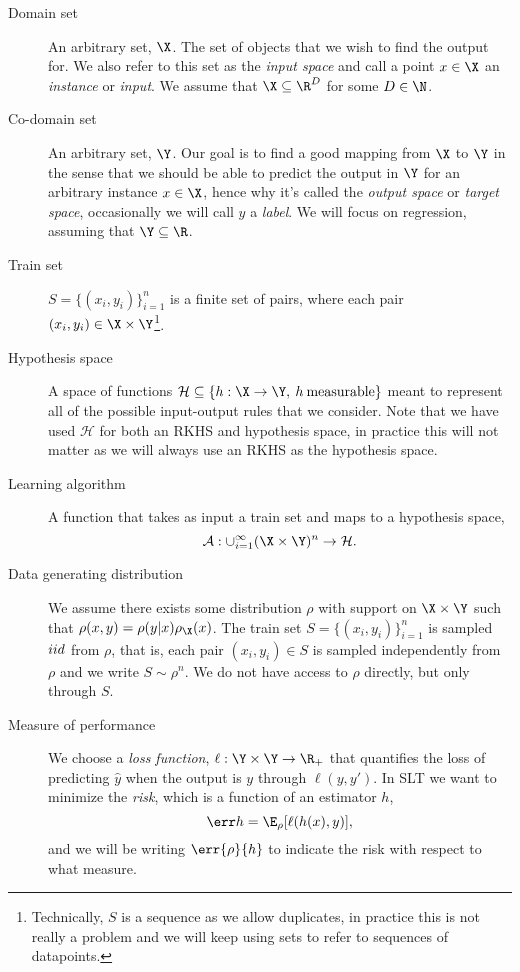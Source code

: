 \begin{description}
\item[{Domain set}] An arbitrary set, \(\X\). The set of objects that we wish to
find the output for. We also refer to this set as the \emph{input space} and
call a point \(x \in \X\) an \emph{instance} or \emph{input}. We assume that
\(\X \subseteq \R^{D}\) for some \(D \in \N\).
\item[{Co-domain set}] An arbitrary set, \(\Y\). Our goal is to find a good
mapping from \(\X\) to \(\Y\) in the sense that we should be able to predict the
output in \(\Y\) for an arbitrary instance \(x \in \X\), hence why it's called
the \emph{output space} or \emph{target space}, occasionally we will call \(y\)
a \emph{label}. We will focus on regression, assuming that \(\Y \subseteq \R\).
\item[{Train set}] \(S = \{(x_{i}, y_{i})\}_{i=1}^{n}\) is a finite set of
pairs, where each pair \((x_{i}, y_{i}) \in \X \times \Y\)\footnote{Technically,
\(S\) is a sequence as we allow duplicates, in practice this is not really a
problem and we will keep using sets to refer to sequences of datapoints.}.
\item[{Hypothesis space}] A space of functions \(\mathcal{H} \subseteq \{h : \X
\to \Y, \: h \: \mathrm{measurable}\}\) meant to represent all of the possible
input-output rules that we consider. Note that we have used \(\mathcal{H}\) for
both an RKHS and hypothesis space, in practice this will not matter as we will
always use an RKHS as the hypothesis space.
\item[{Learning algorithm}] A function that takes as input a train set and maps
  to a hypothesis space,
  \begin{equation}
    \label{eq:sl-algorithm}
    \algo : \cup_{i=1}^{\infty} (\X \times \Y)^{n} \to \mathcal{H}.
  \end{equation}
\item[{Data generating distribution}] We assume there exists some distribution
\(\rho\) with support on \(\X \times \Y\) such that \(\rho(x, y) = \rho(y |
x)\rho_{\X}(x)\). The train set \(S = \{(x_{i}, y_{i})\}_{i=1}^{n}\) is sampled
\(iid\) from \(\rho\), that is, each pair \((x_{i}, y_{i}) \in S\) is sampled
independently from \(\rho\) and we write \(S \sim \rho^{n}\). We do not have
access to \(\rho\) directly, but only through \(S\).
\item[{Measure of performance}] We choose a \emph{loss function}, \(\ell : \Y
\times \Y \to \R_{+}\) that quantifies the loss of predicting \(\hat{y}\) when
the output is \(y\) through \(\ell(y, y')\). In SLT we want to minimize
the \emph{risk}, which is a function of an estimator \(h\),
\begin{equation}
\label{eq:def-risk} \risk{}{h} = \E_{\rho}[\ell(h(x), y)],
\end{equation} and we will be writing \(\err{\rho}{h}\) to indicate the risk
with respect to what measure.
\end{description}

